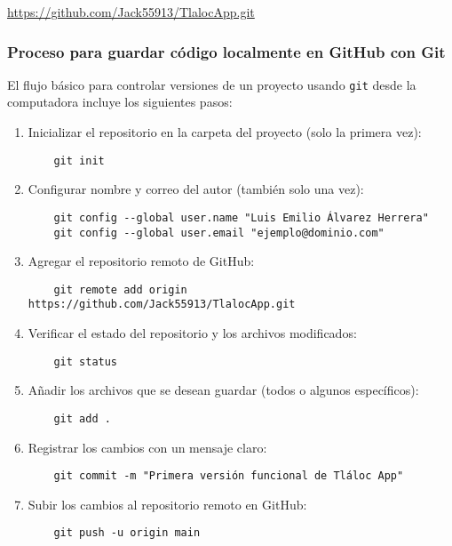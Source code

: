 \begin{center}
\url{https://github.com/Jack55913/TlalocApp.git}
\end{center}

\subsubsection*{Proceso para guardar código localmente en GitHub con Git}

El flujo básico para controlar versiones de un proyecto usando \texttt{git} desde la computadora incluye los siguientes pasos:

\begin{enumerate}
    \item Inicializar el repositorio en la carpeta del proyecto (solo la primera vez):
    \begin{verbatim}
    git init
    \end{verbatim}
    
    \item Configurar nombre y correo del autor (también solo una vez):
    \begin{verbatim}
    git config --global user.name "Luis Emilio Álvarez Herrera"
    git config --global user.email "ejemplo@dominio.com"
    \end{verbatim}
    
    \item Agregar el repositorio remoto de GitHub:
    \begin{verbatim}
    git remote add origin https://github.com/Jack55913/TlalocApp.git
    \end{verbatim}
    
    \item Verificar el estado del repositorio y los archivos modificados:
    \begin{verbatim}
    git status
    \end{verbatim}
    
    \item Añadir los archivos que se desean guardar (todos o algunos específicos):
    \begin{verbatim}
    git add .
    \end{verbatim}
    
    \item Registrar los cambios con un mensaje claro:
    \begin{verbatim}
    git commit -m "Primera versión funcional de Tláloc App"
    \end{verbatim}
    
    \item Subir los cambios al repositorio remoto en GitHub:
    \begin{verbatim}
    git push -u origin main
    \end{verbatim}
\end{enumerate}

